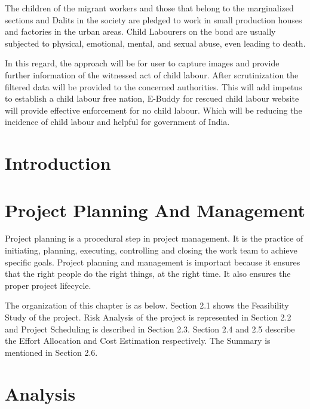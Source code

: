\documentclass{SSBT-BE}
\begin{document}
The children of the migrant workers and those that belong to the marginalized sections and Dalits in the society are pledged to work in small production houses and factories in the urban areas. Child Labourers on the bond are usually subjected to physical, emotional, mental, and sexual abuse, even leading to death.

In this regard, the approach will be for user to capture images and provide further information of the witnessed act of child labour. After scrutinization the filtered data will be provided to the concerned authorities. This will add impetus to establish a child labour free nation, E-Buddy for rescued child labour website will provide effective enforcement for no child labour. Which will be reducing the incidence of child labour and helpful for government of India.

\acknowledge

\chapter{Introduction}


\chapter{Project Planning And Management}
Project planning is a procedural step in project management. It is the practice of initiating, planning, executing, controlling and closing the work team to achieve specific goals. Project planning and management is important because it ensures that the right people do the right things, at the right time.  It also ensures the proper project lifecycle.

The organization of this chapter is as below. Section 2.1 shows the Feasibility Study of the project. Risk Analysis of the project is represented in Section 2.2 and Project Scheduling is described in Section 2.3. Section 2.4 and 2.5 describe the Effort Allocation and Cost Estimation respectively. The Summary is mentioned in Section 2.6.



\label{CH-Key Management}
%

\chapter{Analysis}

\end{document}
